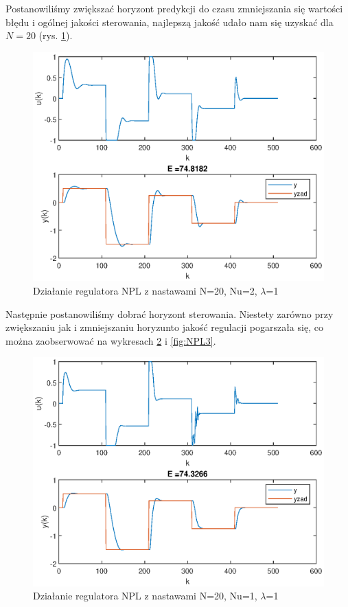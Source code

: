 		Postanowiliśmy zwiększać horyzont predykcji do czasu zmniejszania się wartości błędu i ogólnej jakości sterowania, najlepszą jakość udało nam się uzyskać dla $N=20$ (rys. \ref{fig:NPL1}).
		\begin{figure}[h!]
			\centering
			\includegraphics[width=\linewidth]{img/NPLN20.eps}
			\caption{Działanie regulatora NPL z nastawami N=20, Nu=2, $\lambda$=1}
			\label{fig:NPL1}
		\end{figure}
		
		Następnie postanowiliśmy dobrać horyzont sterowania. Niestety zarówno przy zwiększaniu jak i zmniejszaniu horyzunto jakość regulacji pogarszała się, co można zaobserwować na wykresach \ref{fig:NPL2} i \ref{fig:NPL3}.
		\begin{figure}[h!]
			\centering
			\includegraphics[width=\linewidth]{img/NPLNu1.eps}
			\caption{Działanie regulatora NPL z nastawami N=20, Nu=1, $\lambda$=1}
			\label{fig:NPL2}
		\end{figure}
		
